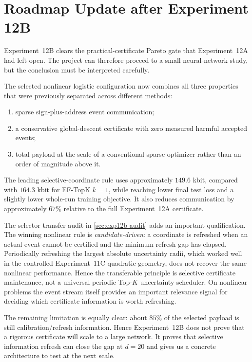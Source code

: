 \section{Roadmap Update after Experiment 12B}
\label{sec:roadmap-post-12b}

Experiment~12B clears the practical-certificate Pareto gate that Experiment~12A had left open. The project can therefore proceed to a small neural-network study, but the conclusion must be interpreted carefully.

The selected nonlinear logistic configuration now combines all three properties that were previously separated across different methods:
\begin{enumerate}
 \item sparse sign-plus-address event communication;
 \item a conservative global-descent certificate with zero measured harmful accepted events;
 \item total payload at the scale of a conventional sparse optimizer rather than an order of magnitude above it.
\end{enumerate}
The leading selective-coordinate rule uses approximately $149.6$ kbit, compared with $164.3$ kbit for EF-TopK $k=1$, while reaching lower final test loss and a slightly lower whole-run training objective. It also reduces communication by approximately $67\%$ relative to the full Experiment~12A certificate.

The selector-transfer audit in \cref{sec:exp12b-audit} adds an important qualification. The winning nonlinear rule is \emph{candidate-driven}: a coordinate is refreshed when an actual event cannot be certified and the minimum refresh gap has elapsed. Periodically refreshing the largest absolute uncertainty radii, which worked well in the controlled Experiment~11C quadratic geometry, does not recover the same nonlinear performance. Hence the transferable principle is selective certificate maintenance, not a universal periodic Top-$K$ uncertainty scheduler. On nonlinear problems the event stream itself provides an important relevance signal for deciding which certificate information is worth refreshing.

The remaining limitation is equally clear: about $85\%$ of the selected payload is still calibration/refresh information. Hence Experiment~12B does not prove that a rigorous certificate will scale to a large network. It proves that selective information refresh can close the gap at $d=20$ and gives us a concrete architecture to test at the next scale.

